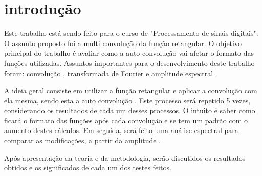 \chapter{introdução}
\label{cap1}

Este trabalho está sendo feito para o curso de "Processamento de sinais digitais".  O assunto proposto foi a multi convolução da função retangular.
O objetivo principal do trabalho é avaliar como a auto convolução \citep{Lourenildo(2015)} vai afetar o formato das funções utilizadas. Assuntos importantes para o desenvolvimento deste trabalho foram: convolução \citep{snieder1998}, transformada de Fourier \citep{Smirnov(1964)} e amplitude espectral \citep{Leite(2007)}.

A ideia geral consiste em utilizar a função retangular e aplicar a convolução com ela mesma, sendo esta a auto convolução \citep{snieder1998}. Este processo será repetido 5 vezes, considerando os resultados de cada um desses processos. O intuito é saber como ficará o formato das funções após cada convolução e se tem um padrão com o aumento destes cálculos. Em seguida, será feito uma análise espectral para comparar as modificações, a partir da amplitude \citep{Lourenildo(2015)}.

Após apresentação da teoria e da metodologia, serão discutidos os resultados obtidos e os significados de cada um dos testes feitos.  








